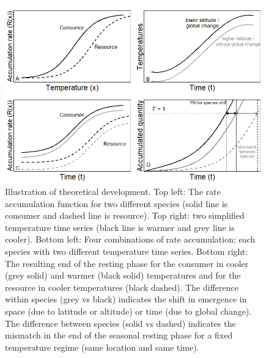 \documentclass[12 pt]{article}
\begin{document}
\clearpage

\begin{figure}
    \centering
    \includegraphics[width = 17 cm, keepaspectratio]{Conceptual}
    \caption{Illustration of theoretical development. Top left: The rate accumulation function for two different species (solid line is consumer and dashed line is resource). Top right: two simplified temperature time series (black line is warmer and grey line is cooler). Bottom left: Four combinations of rate accumulation; each species with two different temperature time series. Bottom right: The resulting end of the resting phase for the consumer in cooler (grey solid) and warmer (black solid) temperatures and for the resource in cooler temperatures (black dashed). The difference within species (grey vs black) indicates the shift in emergence in space (due to latitude or altitude) or time (due to global change). The difference between species (solid vs dashed) indicates the mismatch in the end of the seasonal resting phase for a fixed temperature regime (same location and same time).}
    \label{fig:generaltheory}
\end{figure}
\end{document}
